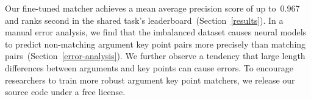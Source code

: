 Our fine-tuned \RobertaBase matcher achieves a mean average precision score of up to~0.967 and ranks second in the 
shared task's leaderboard~(Section~\ref{results}).
In a manual error analysis, we find that the imbalanced \ArgKP dataset causes neural models to predict non-matching 
argument key point pairs more precisely than matching pairs~(Section~\ref{error-analysis}).
We further observe a tendency that large length differences between arguments and key points can cause errors. 
To encourage researchers to train more robust argument key point matchers, we release our source code under a free license.%
